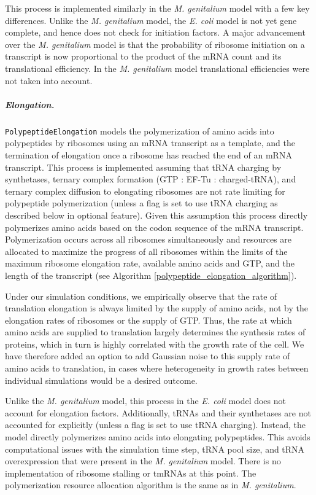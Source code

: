 \documentclass[12pt]{article}
\begin{document}
This process is implemented similarly in the \emph{M. genitalium} model with a few key differences. Unlike the \emph{M. genitalium} model, the \emph{E. coli} model is not yet gene complete, and hence does not check for initiation factors. A major advancement over the \emph{M. genitalium} model is that the probability of ribosome initiation on a transcript is now proportional to the product of the mRNA count and its translational efficiency. In the \emph{M. genitalium} model translational efficiencies were not taken into account.

\subparagraph{Elongation.}
\texttt{PolypeptideElongation} models the polymerization of amino acids into polypeptides by ribosomes using an mRNA transcript as a template, and the termination of elongation once a ribosome has reached the end of an mRNA transcript. This process is implemented assuming that tRNA charging by synthetases, ternary complex formation (GTP : EF-Tu : charged-tRNA), and ternary complex diffusion to elongating ribosomes are not rate limiting for polypeptide polymerization (unless a flag is set to use tRNA charging as described below in optional feature). Given this assumption this process directly polymerizes amino acids based on the codon sequence of the mRNA transcript. Polymerization occurs across all ribosomes simultaneously and resources are allocated to maximize the progress of all ribosomes within the limits of the maximum ribosome elongation rate, available amino acids and GTP, and the length of the transcript (see Algorithm \ref{polypeptide_elongation_algorithm}).

Under our simulation conditions, we empirically observe that the rate of translation elongation is always limited by the supply of amino acids, not by the elongation rates of ribosomes or the supply of GTP. Thus, the rate at which amino acids are supplied to translation largely determines the synthesis rates of proteins, which in turn is highly correlated with the growth rate of the cell. We have therefore added an option to add Gaussian noise to this supply rate of amino acids to translation, in cases where heterogeneity in growth rates between individual simulations would be a desired outcome.

Unlike the \emph{M. genitalium} model, this process in the \emph{E. coli} model does not account for elongation factors. Additionally, tRNAs and their synthetases are not accounted for explicitly (unless a flag is set to use tRNA charging). Instead, the model directly polymerizes amino acids into elongating polypeptides. This avoids computational issues with the simulation time step, tRNA pool size, and tRNA overexpression that were present in the \emph{M. genitalium} model. There is no implementation of ribosome stalling or tmRNAs at this point. The polymerization resource allocation algorithm is the same as in \emph{M. genitalium}.\\
\end{document}
